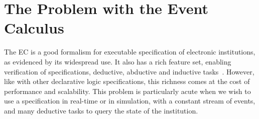 




\section{The Problem with the Event Calculus}\label{sec:ecperf}

The \ac{EC} is a good formalism for executable specification of electronic
institutions, as evidenced by its widespread use. It also has a rich feature
set, enabling verification of specifications, deductive, abductive and
inductive tasks~\citep{Shanahan1999}. However, like with other declarative
logic specifications, this richness comes at the cost of performance and
scalability. This problem is particularly acute when we wish to use a
specification in real-time or in simulation, with a constant stream of events,
and many deductive tasks to query the state of the institution.

